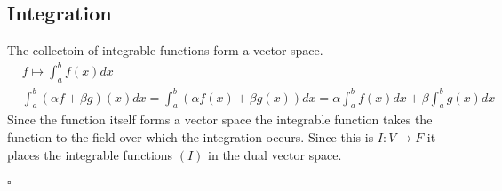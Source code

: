 \documentclass[a4paper]{article}
\begin{document}
\subsection{Integration \cite{wiki:integration}}
The collectoin of integrable functions form a vector space.
\begin{align}
  &f \mapsto \int_a^b f(x) dx\\
  &\int_a^b (\alpha f + \beta g)(x) dx = \int_a^b (\alpha f(x)+\beta g(x)) dx=\alpha \int_a^b f(x)dx + \beta \int_a^b g(x)dx
\end{align}
Since the function itself forms a vector space the integrable function takes the function to the field over which the integration occurs. Since this is $I:V \to F$ it places the integrable functions $(I)$ in the dual vector space.
\\ \\
$\square$


\end{document}
